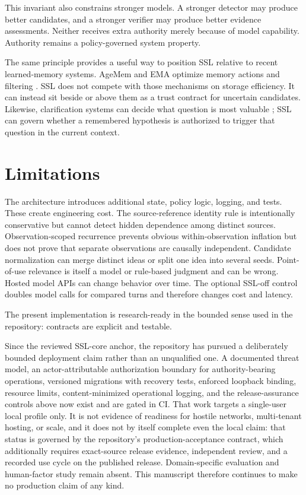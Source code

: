 \documentclass[11pt]{article}
\begin{document}
This invariant also constrains stronger models. A stronger detector may produce better candidates, and a stronger verifier may produce better evidence assessments. Neither receives extra authority merely because of model capability. Authority remains a policy-governed system property.

The same principle provides a useful way to position SSL relative to recent learned-memory systems. AgeMem and EMA optimize memory actions and filtering \citep{yu2026agentic,lan2026ema}. SSL does not compete with those mechanisms on storage efficiency. It can instead sit beside or above them as a trust contract for uncertain candidates. Likewise, clarification systems can decide what question is most valuable \citep{zhao2026askbench,suri2026structured}; SSL can govern whether a remembered hypothesis is authorized to trigger that question in the current context.

\section{Limitations}

The architecture introduces additional state, policy logic, logging, and tests. These create engineering cost. The source-reference identity rule is intentionally conservative but cannot detect hidden dependence among distinct sources. Observation-scoped recurrence prevents obvious within-observation inflation but does not prove that separate observations are causally independent. Candidate normalization can merge distinct ideas or split one idea into several seeds. Point-of-use relevance is itself a model or rule-based judgment and can be wrong. Hosted model APIs can change behavior over time. The optional SSL-off control doubles model calls for compared turns and therefore changes cost and latency.

The present implementation is research-ready in the bounded sense used in the repository: contracts are explicit and testable.

Since the reviewed SSL-core anchor, the repository has pursued a deliberately bounded deployment claim rather than an unqualified one. A documented threat model, an actor-attributable authorization boundary for authority-bearing operations, versioned migrations with recovery tests, enforced loopback binding, resource limits, content-minimized operational logging, and the release-assurance controls above now exist and are gated in CI. That work targets a single-user local profile only. It is not evidence of readiness for hostile networks, multi-tenant hosting, or scale, and it does not by itself complete even the local claim: that status is governed by the repository's production-acceptance contract, which additionally requires exact-source release evidence, independent review, and a recorded use cycle on the published release. Domain-specific evaluation and human-factor study remain absent. This manuscript therefore continues to make no production claim of any kind.
\end{document}
